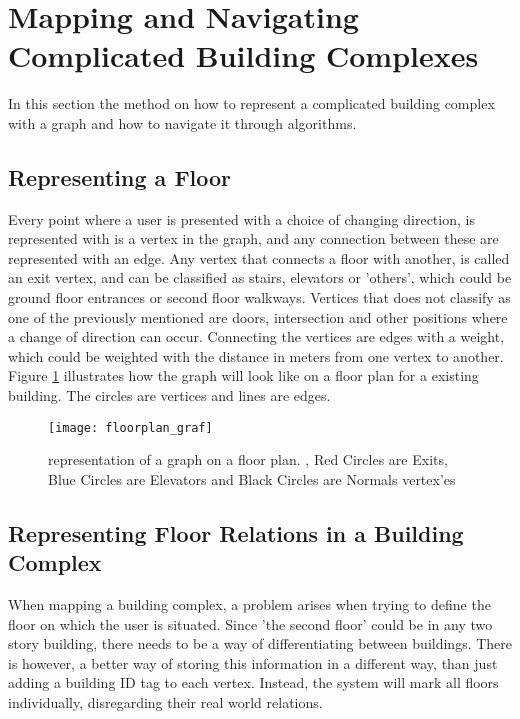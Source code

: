 
\section{Mapping and Navigating Complicated Building Complexes}

In this section the method on how to represent a complicated building complex with a graph and how to navigate it through algorithms.

\subsection{Representing a Floor}

Every point where a user is presented with a choice of changing direction, is represented with is a vertex in the graph, and any connection between these are represented with an edge. \label{e_vertex} Any vertex that connects a floor with another, is called an exit vertex, and can be classified as stairs, elevators or 'others', which could be ground floor entrances or second floor walkways. Vertices that does not classify as one of the previously mentioned are doors, intersection and other positions where a change of direction can occur. Connecting the vertices are edges with a weight, which could be weighted with the distance in meters from one vertex to another. Figure \ref{fig:floorplan_graf} illustrates how the graph will look like on a floor plan for a existing building. The circles are vertices and lines are edges.


\begin{figure}[ht!]
    \centering
    \texttt{[image: floorplan\_graf]}
    \caption{representation of a graph on a floor plan. \cite{billedafbygningudengraf}, Red Circles are Exits, Blue Circles are Elevators and Black Circles are Normals vertex'es}
    \label{fig:floorplan_graf}
  \end{figure}

\subsection{Representing Floor Relations in a Building Complex}

When mapping a building complex, a problem arises when trying to define the floor on which the user is situated. Since 'the second floor' could be in any two story building, there needs to be a way of differentiating between buildings. There is however, a better way of storing this information in a different way, than just adding a building ID tag to each vertex. Instead, the system will mark all floors individually, disregarding their real world relations.

